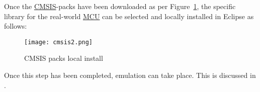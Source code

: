 \newpage\cleardoublepage

Once the \hyperref[listAbr]{CMSIS}-packs have been downloaded as per Figure~\ref{CMSIS1}, the specific library for the real-world \hyperref[listAbr]{MCU} can be selected and locally installed in Eclipse as follows:

\begin{figure}[H]
\begin{center}
\texttt{[image: cmsis2.png]}
\caption{CMSIS packs local install}
\label{CMSIS1}
\end{center}
\end{figure}

Once this step has been completed, emulation can take place. This is discussed in \textbf{}. 










